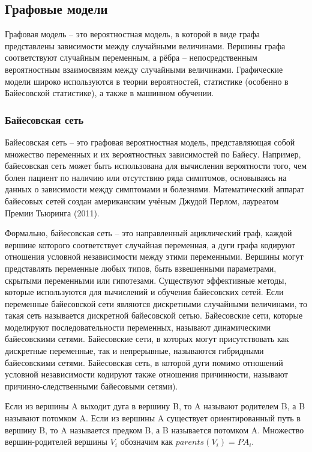 \subsection{Графовые модели}
Графовая модель -- это вероятностная модель, в которой в виде графа представлены зависимости между случайными величинами. Вершины графа соответствуют случайным переменным, а рёбра -- непосредственным вероятностным взаимосвязям между случайными величинами. Графические модели широко используются в теории вероятностей, статистике (особенно в Байесовской статистике), а также в машинном обучении.

\subsubsection*{Байесовская сеть}
Байесовская сеть -- это графовая вероятностная модель, представляющая собой множество переменных и их вероятностных зависимостей по Байесу. Например, байесовская сеть может быть использована для вычисления вероятности того, чем болен пациент по наличию или отсутствию ряда симптомов, основываясь на данных о зависимости между симптомами и болезнями. Математический аппарат байесовых сетей создан американским учёным Джудой Перлом, лауреатом Премии Тьюринга (2011).

Формально, байесовская сеть -- это направленный ациклический граф, каждой вершине которого соответствует случайная переменная, а дуги графа кодируют отношения условной независимости между этими переменными. Вершины могут представлять переменные любых типов, быть взвешенными параметрами, скрытыми переменными или гипотезами. Существуют эффективные методы, которые используются для вычислений и обучения байесовских сетей. Если переменные байесовской сети являются дискретными случайными величинами, то такая сеть называется дискретной байесовской сетью. Байесовские сети, которые моделируют последовательности переменных, называют динамическими байесовскими сетями. Байесовские сети, в которых могут присутствовать как дискретные переменные, так и непрерывные, называются гибридными байесовскими сетями. Байесовская сеть, в которой дуги помимо отношений условной независимости кодируют также отношения причинности, называют причинно-следственными байесовыми сетями).

Если из вершины A выходит дуга в вершину B, то A называют родителем B, а B называют потомком A. Если из вершины A существует ориентированный путь в вершину B, то A называется предком B, а B называется потомком A.
Множество вершин-родителей вершины \(V_i\) обозначим как \(parents(V_i) = PA_i\).

